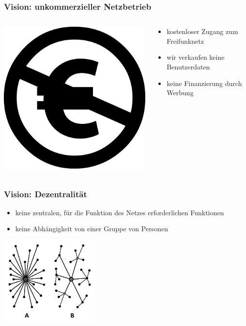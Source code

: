 \documentclass[10pt]{beamer}
\begin{document}
\begin{frame}
	\frametitle{Vision: unkommerzieller Netzbetrieb}
	\begin{columns}[c]
		\begin{column}{4cm}
			\includegraphics[width=\textwidth]{images/non-commercial-eu}
		\end{column}
		\begin{column}{8cm}
			\begin{itemize}[<+->]
				\item kostenloser Zugang zum Freifunknetz
				\item wir verkaufen keine Benutzerdaten
				\item keine Finanzierung durch Werbung
			\end{itemize}
		\end{column}
	\end{columns}	
\end{frame}

\begin{frame}
	\frametitle{Vision: Dezentralität}
	
	\begin{itemize}[<+->]
		\item keine zentralen, für die Funktion des Netzes erforderlichen Funktionen
		\item keine Abhängigkeit von einer Gruppe von Personen
	\end{itemize}
	\centering
	\vfill
	\includegraphics[width=5cm]{images/decentral}
\end{frame}
\end{document}
